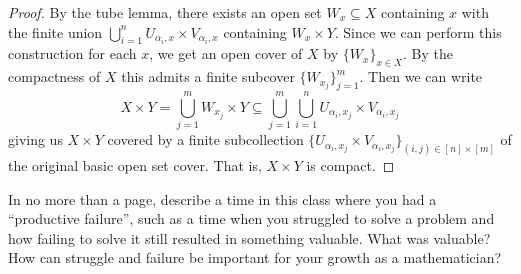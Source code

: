 \documentclass[12 pt, letterpaper]{hmcpset}
\begin{document}
\begin{solution}
\begin{proof}
		By the tube lemma, there exists an open set $W_{x} \subseteq X$ containing $x$ with the finite union $\bigcup_{i = 1}^{n} U_{\alpha_{i}, x} \times V_{\alpha_{i}, x}$ containing $W_{x} \times Y$. Since we can perform this construction for each $x$, we get an open cover of $X$ by  $\{ W_{x} \}_{x \in X}$. By the compactness of $X$ this admits a finite subcover $\{ W_{x_{j}} \}_{j = 1}^{m}$. Then we can write
		\[
			X \times Y = \bigcup_{j = 1}^{m} W_{x_{j}} \times Y \subseteq \bigcup_{j = 1}^{m} \bigcup_{i = 1}^{n} U_{\alpha_{i}, x_{j}} \times V_{\alpha_{i}, x_{j}}
		\]
		giving us $X \times Y$ covered by a finite subcollection $\{ U_{\alpha_{i}, x_{j}} \times V_{\alpha_{i}, x_{j}} \}_{(i, j) \in [n] \times [m]}$ of the original basic open set cover. That is, $X \times Y$ is compact.
	\end{proof}
\end{solution}

\pagebreak

\begin{problem}[Problem 5]
	In no more than a page, describe a time in this class where you had a ``productive failure'', such as a time when you struggled to solve a problem and how failing to solve it still resulted in something valuable. What was valuable? How can struggle and failure be important for your growth as a mathematician?
\end{problem}
\end{document}
